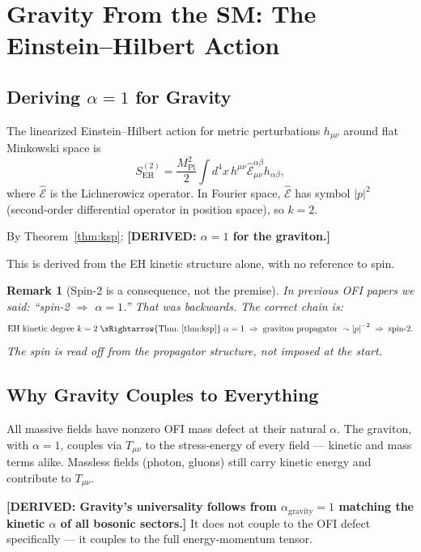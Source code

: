 \documentclass[12pt]{article}
\newtheorem{remark}[theorem]{Remark}
\theoremstyle{definition}
\newcommand{\abs}[1]{\left|#1\right|}
\newcommand{\DERIVED}[1]{\textcolor{derivedcolor}{\textbf{[DERIVED: #1]}}}
\begin{document}
\section{Gravity From the SM: The Einstein--Hilbert Action}
\label{sec:gravity}

\subsection{Deriving $\alpha=1$ for Gravity}

The linearized Einstein--Hilbert action for metric perturbations
$h_{\mu\nu}$ around flat Minkowski space is
\begin{equation}
  S_{\mathrm{EH}}^{(2)}
  = \frac{M_{\mathrm{Pl}}^2}{2}
    \int d^4x\, h^{\mu\nu} \hat{\mathcal{E}}^{\alpha\beta}_{\mu\nu} h_{\alpha\beta},
\end{equation}
where $\hat{\mathcal{E}}$ is the Lichnerowicz operator.  In Fourier space,
$\hat{\mathcal{E}}$ has symbol $\abs{p}^2$ (second-order differential
operator in position space), so $k=2$.

By Theorem~\ref{thm:ksp}: \DERIVED{$\alpha = 1$ for the graviton.}

This is derived from the EH kinetic structure alone, with no reference to spin.

\begin{remark}[Spin-2 is a consequence, not the premise]
In previous OFI papers we said: ``spin-2 $\Rightarrow$ $\alpha=1$.''
That was backwards.  The correct chain is:
\[
  \text{EH kinetic degree } k=2
  \;\xRightarrow{\text{Thm.~\ref{thm:ksp}}}\;
  \alpha = 1
  \;\Rightarrow\;
  \text{graviton propagator } \sim \abs{p}^{-2}
  \;\Rightarrow\;
  \text{spin-2.}
\]
The spin is read off from the propagator structure, not imposed at the start.
\end{remark}

\subsection{Why Gravity Couples to Everything}

All massive fields have nonzero OFI mass defect at their natural $\alpha$.
The graviton, with $\alpha=1$, couples via $T_{\mu\nu}$ to the
stress-energy of every field — kinetic and mass terms alike.  Massless
fields (photon, gluons) still carry kinetic energy and contribute
to $T_{\mu\nu}$.

\DERIVED{Gravity's universality follows from $\alpha_{\mathrm{gravity}}=1$
matching the kinetic $\alpha$ of all bosonic sectors.}  It does not couple
to the OFI defect specifically — it couples to the full energy-momentum
tensor.
\end{document}
